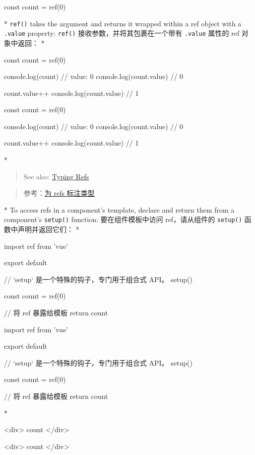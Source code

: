 \begin{paracol}{2}
\begin{codeJs}
const count = ref(0)
\end{codeJs}
\switchcolumn[0]*%
\texttt{ref()} takes the argument and returns it wrapped within a ref
object with a \texttt{.value} property:
\switchcolumn
\texttt{ref()} 接收参数，并将其包裹在一个带有 \texttt{.value} 属性的 ref
对象中返回：
\switchcolumn[0]*%
\begin{codeJs}
const count = ref(0)

console.log(count) // { value: 0 }
console.log(count.value) // 0

count.value++
console.log(count.value) // 1
\end{codeJs}
\switchcolumn
\begin{codeJs}
const count = ref(0)

console.log(count) // { value: 0 }
console.log(count.value) // 0

count.value++
console.log(count.value) // 1
\end{codeJs}

\switchcolumn[0]*%
\begin{quote}
See also:
\href{https://vuejs.org/guide/typescript/composition-api.html\#typing-ref}{Typing
Refs}
\end{quote}
\switchcolumn
\begin{quote}
参考：\href{https://cn.vuejs.org/guide/typescript/composition-api.html\#typing-ref}{为
refs 标注类型}
\end{quote}
\switchcolumn[0]*%
To access refs in a component's template, declare and return them from a
component's \texttt{setup()} function:
\switchcolumn
要在组件模板中访问 ref，请从组件的 \texttt{setup()}
函数中声明并返回它们：
\switchcolumn[0]*%
\begin{codeJs}
import { ref } from 'vue'

export default {
    // `setup` 是一个特殊的钩子，专门用于组合式 API。
    setup() {
    const count = ref(0)

    // 将 ref 暴露给模板
    return {
        count
    }
    }
}
\end{codeJs}
\switchcolumn
\begin{codeJs}
import { ref } from 'vue'

export default {
    // `setup` 是一个特殊的钩子，专门用于组合式 API。
    setup() {
    const count = ref(0)

    // 将 ref 暴露给模板
    return {
        count
    }
    }
}
\end{codeJs}
\switchcolumn[0]*%
\begin{codeHtml}
<div>{{ count }}</div>
\end{codeHtml}  
\switchcolumn
\begin{codeHtml}
<div>{{ count }}</div>
\end{codeHtml}  


\end{paracol}
